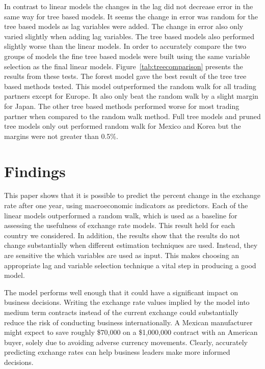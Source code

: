\documentclass{sig-alternate-05-2015}
\begin{document}
\par{} In contrast to linear models the changes in the lag did not decrease error in the same way for tree based models. It seems the change in error was random for the tree based models as lag variables were added. The change in error also only varied slightly when adding lag variables. The tree based models also performed slightly worse than the linear models. In order to accurately compare the two groups of models the fine tree based models were built using the same variable selection as the final linear models. Figure~\ref{tab:treecomparison} presents the results from these tests. The forest model gave the best result of the tree tree based methods tested. This model outperformed the random walk for all trading partners except for Europe. It also only beat the random walk by a slight margin for Japan. The other tree based methods performed worse for most trading partner when compared to the random walk method. Full tree models and pruned tree models only out performed random walk for Mexico and Korea but the margins were not greater than 0.5\%.   


\section{Findings}

This paper shows that it is possible to predict the percent change in the exchange rate after one year, using macroeconomic indicators as predictors. Each of the linear models outperformed a random walk, which is used as a baseline for assessing the usefulness of exchange rate models. This result held for each country we considered. In addition, the results show that the results do not change substantially when different estimation techniques are used. Instead, they are sensitive the which variables are used as input. This makes choosing an appropriate lag and variable selection technique a vital step in producing a good model.

The model performs well enough that it could have a significant impact on business decisions. Writing the exchange rate values implied by the model into medium term contracts instead of the current exchange could substantially reduce the risk of conducting business internationally. A Mexican manufacturer might expect to save roughly \$70,000 on a \$1,000,000 contract with an American buyer, solely due to avoiding adverse currency movements. Clearly, accurately predicting exchange rates can help business leaders make more informed decisions.
\end{document}
